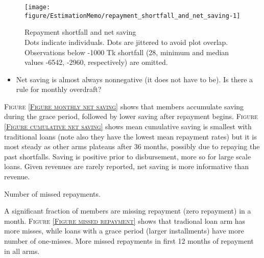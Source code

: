 \begin{Schunk}
\begin{figure}

{\centering \texttt{[image: figure/EstimationMemo/repayment\_shortfall\_and\_net\_saving-1]} 

}

\caption{Repayment shortfall and net saving\\ {\footnotesize Dots indicate individuals. Dots are jittered to avoid plot overlap. Observations below -1000 Tk shortfall (28, minimum and median values -6542, -2960, respectively) are omitted. \setlength{\baselineskip}{8pt}}}\label{Figure repayment shortfall and net saving}
\end{figure}
\end{Schunk}
\begin{itemize}
\vspace{1.0ex}\setlength{\itemsep}{1.0ex}\setlength{\baselineskip}{12pt}
\item	Net saving is almost always nonnegative (it does not have to be). Is there a rule for monthly overdraft?
\end{itemize}
\begin{palepinkleftbar}
\begin{finding}
\textsc{\small Figure \ref{Figure monthly net saving}} shows that members accumulate saving during the grace period, followed by lower saving after repayment begins.  \textsc{\small Figure \ref{Figure cumulative net saving}} shows mean cumulative saving is smallest with traditional loans (note also they have the lowest mean repayment rates) but it is most steady as other arms plateaus after 36 months, possibly due to repaying the past shortfalls. Saving is positive prior to disbursement, more so for large scale loans. Given revenues are rarely reported, net saving is more informative than revenue.
\end{finding}
\end{palepinkleftbar}
\noindent
Number of missed repayments.
\begin{palepinkleftbar}
\begin{finding}
A significant fraction of members are missing repayment (zero repayment) in a month. \textsc{\small Figure \ref{Figure missed repayment}} shows that tradional loan arm has more misses, while loans with a grace period (larger installments) have more number of one-misses. More missed repayments in first 12 months of repayment in all arms.
\end{finding}
\end{palepinkleftbar}
